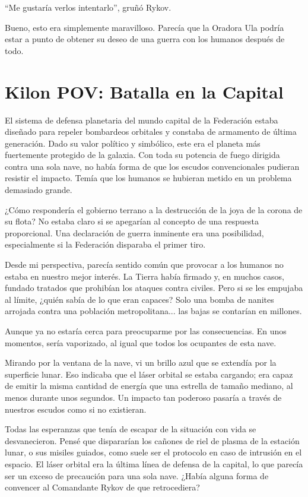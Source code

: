 \documentclass[spanish,12pt,a4paper,oneside,titlepage]{book}
\begin{document}
    ``Me gustaría verlos intentarlo'', gruñó Rykov.

    Bueno, esto era simplemente maravilloso. Parecía que la Oradora Ula podría estar a punto de obtener su deseo de una guerra con los humanos después de todo.

    \chapter{Kilon POV: Batalla en la Capital}

    El sistema de defensa planetaria del mundo capital de la Federación estaba diseñado para repeler bombardeos orbitales y constaba de armamento de última generación. Dado su valor político y simbólico, este era el planeta más fuertemente protegido de la galaxia. Con toda su potencia de fuego dirigida contra una sola nave, no había forma de que los escudos convencionales pudieran resistir el impacto. Temía que los humanos se hubieran metido en un problema demasiado grande.

    ¿Cómo respondería el gobierno terrano a la destrucción de la joya de la corona de su flota? No estaba claro si se apegarían al concepto de una respuesta proporcional. Una declaración de guerra inminente era una posibilidad, especialmente si la Federación disparaba el primer tiro.

    Desde mi perspectiva, parecía sentido común que provocar a los humanos no estaba en nuestro mejor interés. La Tierra había firmado y, en muchos casos, fundado tratados que prohibían los ataques contra civiles. Pero si se les empujaba al límite, ¿quién sabía de lo que eran capaces? Solo una bomba de nanites arrojada contra una población metropolitana... las bajas se contarían en millones.

    Aunque ya no estaría cerca para preocuparme por las consecuencias. En unos momentos, sería vaporizado, al igual que todos los ocupantes de esta nave.

    Mirando por la ventana de la nave, vi un brillo azul que se extendía por la superficie lunar. Eso indicaba que el láser orbital se estaba cargando; era capaz de emitir la misma cantidad de energía que una estrella de tamaño mediano, al menos durante unos segundos. Un impacto tan poderoso pasaría a través de nuestros escudos como si no existieran.

    Todas las esperanzas que tenía de escapar de la situación con vida se desvanecieron. Pensé que dispararían los cañones de riel de plasma de la estación lunar, o sus misiles guiados, como suele ser el protocolo en caso de intrusión en el espacio. El láser orbital era la última línea de defensa de la capital, lo que parecía ser un exceso de precaución para una sola nave. ¿Había alguna forma de convencer al Comandante Rykov de que retrocediera?
\end{document}
